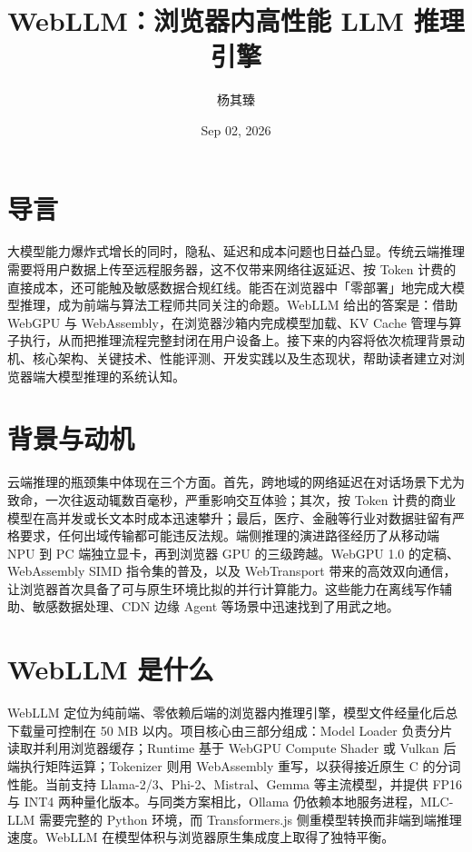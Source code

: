 \title{WebLLM：浏览器内高性能 LLM 推理引擎}
\author{杨其臻}
\date{Sep 02, 2026}
\maketitle
\chapter{导言}
大模型能力爆炸式增长的同时，隐私、延迟和成本问题也日益凸显。传统云端推理需要将用户数据上传至远程服务器，这不仅带来网络往返延迟、按 Token 计费的直接成本，还可能触及敏感数据合规红线。能否在浏览器中「零部署」地完成大模型推理，成为前端与算法工程师共同关注的命题。WebLLM 给出的答案是：借助 WebGPU 与 WebAssembly，在浏览器沙箱内完成模型加载、KV Cache 管理与算子执行，从而把推理流程完整封闭在用户设备上。接下来的内容将依次梳理背景动机、核心架构、关键技术、性能评测、开发实践以及生态现状，帮助读者建立对浏览器端大模型推理的系统认知。\par
\chapter{背景与动机}
云端推理的瓶颈集中体现在三个方面。首先，跨地域的网络延迟在对话场景下尤为致命，一次往返动辄数百毫秒，严重影响交互体验；其次，按 Token 计费的商业模型在高并发或长文本时成本迅速攀升；最后，医疗、金融等行业对数据驻留有严格要求，任何出域传输都可能违反法规。端侧推理的演进路径经历了从移动端 NPU 到 PC 端独立显卡，再到浏览器 GPU 的三级跨越。WebGPU 1.0 的定稿、WebAssembly SIMD 指令集的普及，以及 WebTransport 带来的高效双向通信，让浏览器首次具备了可与原生环境比拟的并行计算能力。这些能力在离线写作辅助、敏感数据处理、CDN 边缘 Agent 等场景中迅速找到了用武之地。\par
\chapter{WebLLM 是什么}
WebLLM 定位为纯前端、零依赖后端的浏览器内推理引擎，模型文件经量化后总下载量可控制在 50 MB 以内。项目核心由三部分组成：Model Loader 负责分片读取并利用浏览器缓存；Runtime 基于 WebGPU Compute Shader 或 Vulkan 后端执行矩阵运算；Tokenizer 则用 WebAssembly 重写，以获得接近原生 C 的分词性能。当前支持 Llama-2/3、Phi-2、Mistral、Gemma 等主流模型，并提供 FP16 与 INT4 两种量化版本。与同类方案相比，Ollama 仍依赖本地服务进程，MLC-LLM 需要完整的 Python 环境，而 Transformers.js 侧重模型转换而非端到端推理速度。WebLLM 在模型体积与浏览器原生集成度上取得了独特平衡。\par
